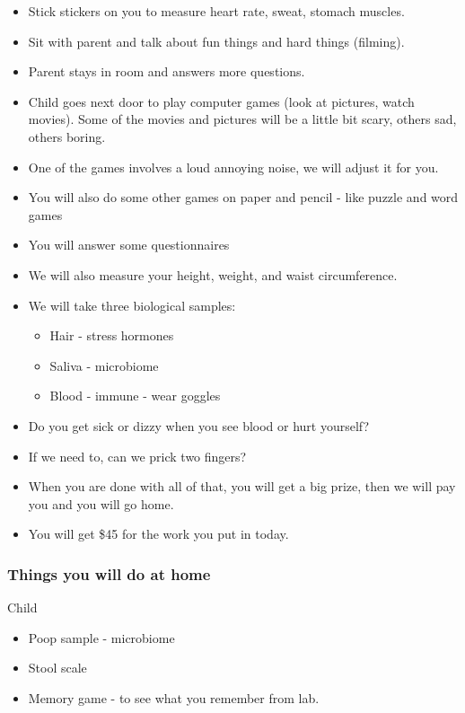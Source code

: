 \documentclass[]{book}
\providecommand{\tightlist}{%
  \setlength{\itemsep}{0pt}\setlength{\parskip}{0pt}}
\begin{document}
\begin{itemize}
\tightlist
\item
  Stick stickers on you to measure heart rate, sweat, stomach muscles.
\item
  Sit with parent and talk about fun things and hard things (filming).
\item
  Parent stays in room and answers more questions.
\item
  Child goes next door to play computer games (look at pictures, watch movies). Some of the movies and pictures will be a little bit scary, others sad, others boring.
\item
  One of the games involves a loud annoying noise, we will adjust it for you.
\item
  You will also do some other games on paper and pencil - like puzzle and word games
\item
  You will answer some questionnaires
\item
  We will also measure your height, weight, and waist circumference.
\item
  We will take three biological samples:

  \begin{itemize}
  \tightlist
  \item
    Hair - stress hormones
  \item
    Saliva - microbiome
  \item
    Blood - immune - wear goggles
  \end{itemize}
\item
  Do you get sick or dizzy when you see blood or hurt yourself?
\item
  If we need to, can we prick two fingers?
\item
  When you are done with all of that, you will get a big prize, then we will pay you and you will go home.
\item
  You will get \$45 for the work you put in today.
\end{itemize}

\hypertarget{things-you-will-do-at-home}{%
\subsubsection{Things you will do at home}\label{things-you-will-do-at-home}}

Child

\begin{itemize}
\tightlist
\item
  Poop sample - microbiome
\item
  Stool scale
\item
  Memory game - to see what you remember from lab.
\end{itemize}
\end{document}
